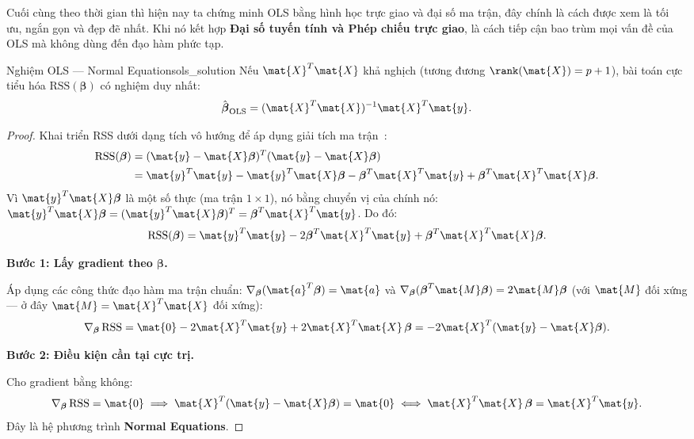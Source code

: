 Cuối cùng theo thời gian thì hiện nay ta chứng minh OLS bằng hình học trực giao và đại số ma trận, đây chính là cách được xem là tối ưu, ngắn gọn và đẹp đẽ nhất. Khi nó kết hợp \textbf{Đại số tuyến tính và Phép chiếu trực giao}, là cách tiếp cận bao trùm mọi vấn đề của OLS mà không dùng đến đạo hàm phức tạp.

\begin{mythm}{Nghiệm OLS — Normal Equations}{ols_solution}
Nếu $\mat{X}^T\mat{X}$ khả nghịch (tương đương $\rank(\mat{X}) = p+1$), bài
toán cực tiểu hóa $\mathrm{RSS}(\boldsymbol{\beta})$ có nghiệm duy nhất:
\[
    \hat{\boldsymbol{\beta}}_{\mathrm{OLS}}
    = (\mat{X}^T\mat{X})^{-1}\mat{X}^T\mat{y}.
\]
\end{mythm}

\begin{proof}
Khai triển RSS dưới dạng tích vô hướng để áp dụng giải tích ma trận~\cite{golub2013}:
\begin{align*}
    \mathrm{RSS}(\boldsymbol{\beta})
    &= (\mat{y} - \mat{X}\boldsymbol{\beta})^T
       (\mat{y} - \mat{X}\boldsymbol{\beta}) \\
    &= \mat{y}^T\mat{y}
     - \mat{y}^T\mat{X}\boldsymbol{\beta}
     - \boldsymbol{\beta}^T\mat{X}^T\mat{y}
     + \boldsymbol{\beta}^T\mat{X}^T\mat{X}\boldsymbol{\beta}.
\end{align*}
Vì $\mat{y}^T\mat{X}\boldsymbol{\beta}$ là một số thực (ma trận $1 \times 1$), nó
bằng chuyển vị của chính nó: $\mat{y}^T\mat{X}\boldsymbol{\beta} =
(\mat{y}^T\mat{X}\boldsymbol{\beta})^T = \boldsymbol{\beta}^T\mat{X}^T\mat{y}$.
Do đó:
\[
    \mathrm{RSS}(\boldsymbol{\beta})
    = \mat{y}^T\mat{y}
    - 2\boldsymbol{\beta}^T\mat{X}^T\mat{y}
    + \boldsymbol{\beta}^T\mat{X}^T\mat{X}\boldsymbol{\beta}.
\]

\medskip
\noindent\textbf{Bước 1: Lấy gradient theo $\boldsymbol{\beta}$.}

Áp dụng các công thức đạo hàm ma trận chuẩn:
$\nabla_{\boldsymbol{\beta}}(\mat{a}^T\boldsymbol{\beta}) = \mat{a}$
và $\nabla_{\boldsymbol{\beta}}(\boldsymbol{\beta}^T\mat{M}\boldsymbol{\beta}) = 2\mat{M}\boldsymbol{\beta}$
(với $\mat{M}$ đối xứng — ở đây $\mat{M} = \mat{X}^T\mat{X}$ đối xứng):
\[
    \nabla_{\boldsymbol{\beta}}\,\mathrm{RSS}
    = \mat{0} - 2\mat{X}^T\mat{y} + 2\mat{X}^T\mat{X}\,\boldsymbol{\beta}
    = -2\mat{X}^T(\mat{y} - \mat{X}\boldsymbol{\beta}).
\]

\medskip
\noindent\textbf{Bước 2: Điều kiện cần tại cực trị.}

Cho gradient bằng không:
\[
    \nabla_{\boldsymbol{\beta}}\,\mathrm{RSS} = \mat{0}
    \;\Longrightarrow\;
    \mat{X}^T(\mat{y} - \mat{X}\boldsymbol{\beta}) = \mat{0}
    \;\Longleftrightarrow\;
    \mat{X}^T\mat{X}\,\boldsymbol{\beta} = \mat{X}^T\mat{y}.
\]
Đây là hệ phương trình \textbf{Normal Equations}.


\end{proof}
